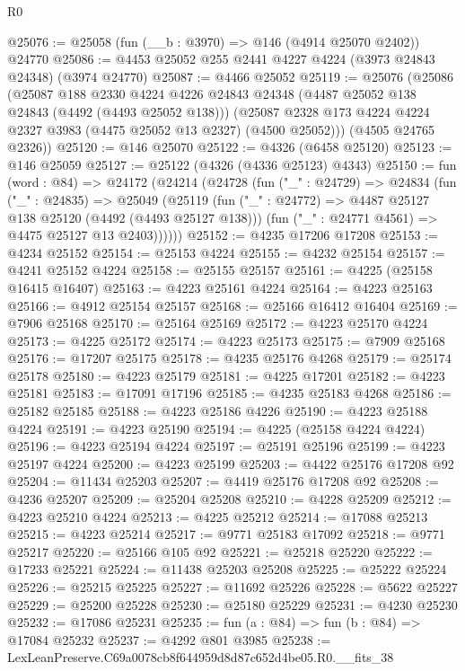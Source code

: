 \begin{lexlean}{R0}
\begin{coremodule}
@25076 := @25058 (fun (__b : @3970) => @146 (@4914 @25070 @2402)) @24770
@25086 := @4453 @25052 @255 @2441 @4227 @4224 (@3973 @24843 @24348) (@3974 @24770)
@25087 := @4466 @25052
@25119 := @25076
    (@25086
      (@25087
        @188
        @2330
        @4224
        @4226
        @24843
        @24348
        (@4487 @25052 @138 @24843 (@4492 (@4493 @25052 @138)))
        (@25087 @2328 @173 @4224 @4224 @2327 @3983 (@4475 @25052 @13 @2327) (@4500 @25052)))
      (@4505 @24765 @2326))
@25120 := @146 @25070
@25122 := @4326 (@6458 @25120)
@25123 := @146 @25059
@25127 := @25122 (@4326 (@4336 @25123) @4343)
@25150 := fun (word : @84) =>
  @24172
    (@24214
      (@24728
        (fun ("_" : @24729) =>
        @24834
          (fun ("_" : @24835) =>
          @25049
            (@25119
              (fun ("_" : @24772) => @4487 @25127 @138 @25120 (@4492 (@4493 @25127 @138)))
              (fun ("_" : @24771 @4561) => @4475 @25127 @13 @2403))))))
@25152 := @4235 @17206 @17208
@25153 := @4234 @25152
@25154 := @25153 @4224
@25155 := @4232 @25154
@25157 := @4241 @25152 @4224
@25158 := @25155 @25157
@25161 := @4225 (@25158 @16415 @16407)
@25163 := @4223 @25161 @4224
@25164 := @4223 @25163
@25166 := @4912 @25154 @25157
@25168 := @25166 @16412 @16404
@25169 := @7906 @25168
@25170 := @25164 @25169
@25172 := @4223 @25170 @4224
@25173 := @4225 @25172
@25174 := @4223 @25173
@25175 := @7909 @25168
@25176 := @17207 @25175
@25178 := @4235 @25176 @4268
@25179 := @25174 @25178
@25180 := @4223 @25179
@25181 := @4225 @17201
@25182 := @4223 @25181
@25183 := @17091 @17196
@25185 := @4235 @25183 @4268
@25186 := @25182 @25185
@25188 := @4223 @25186 @4226
@25190 := @4223 @25188 @4224
@25191 := @4223 @25190
@25194 := @4225 (@25158 @4224 @4224)
@25196 := @4223 @25194 @4224
@25197 := @25191 @25196
@25199 := @4223 @25197 @4224
@25200 := @4223 @25199
@25203 := @4422 @25176 @17208 @92
@25204 := @11434 @25203
@25207 := @4419 @25176 @17208 @92
@25208 := @4236 @25207
@25209 := @25204 @25208
@25210 := @4228 @25209
@25212 := @4223 @25210 @4224
@25213 := @4225 @25212
@25214 := @17088 @25213
@25215 := @4223 @25214
@25217 := @9771 @25183 @17092
@25218 := @9771 @25217
@25220 := @25166 @105 @92
@25221 := @25218 @25220
@25222 := @17233 @25221
@25224 := @11438 @25203 @25208
@25225 := @25222 @25224
@25226 := @25215 @25225
@25227 := @11692 @25226
@25228 := @5622 @25227
@25229 := @25200 @25228
@25230 := @25180 @25229
@25231 := @4230 @25230
@25232 := @17086 @25231
@25235 := fun (a : @84) => fun (b : @84) => @17084 @25232
@25237 := @4292 @801 @3985
@25238 := LexLeanPreserve.C69a0078cb8f644959d8d87c652d4be05.R0.__fits_38

\end{coremodule}
\end{lexlean}
